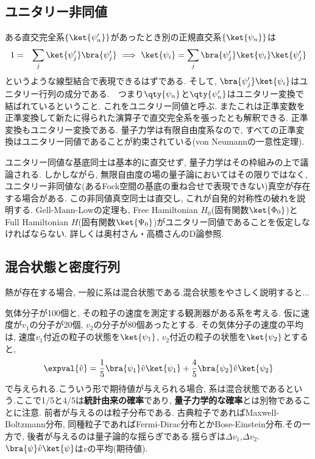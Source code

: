 \documentclass[10.5pt,a4paper]{jreport}
\begin{document}
\subsection{ユニタリー非同値}
ある直交完全系$\{\ket{\psi'_n}\}$があったとき別の正規直交系$\{\ket{\psi_n}\}$は
\begin{eqnarray}
  1 &=& \sum_j\ket{\psi'_j}\bra{\psi'_j}\ \Longrightarrow\ \ket{\psi_i} = \sum_j \bra{\psi'_j}\ket{\psi_i}\ket{\psi'_j}
\end{eqnarray}
というような線型結合で表現できるはずである. そして, $\bra{\psi'_j}\ket{\psi_i}$はユニタリー行列の成分である.　つまり$\qty{\psi_n}$と$\qty{\psi'_n}$はユニタリー変換で結ばれているということ. これをユニタリー同値と呼ぶ. またこれは正準変数を正準変換して新たに得られた演算子で直交完全系を張ったとも解釈できる. 正準変換もユニタリー変換である. 量子力学は有限自由度系なので, すべての正準変換はユニタリー同値であることが約束されている(von Neumannの一意性定理).

ユニタリー同値な基底同士は基本的に直交せず, 量子力学はその枠組みの上で議論される. しかしながら, 無限自由度の場の量子論においてはその限りではなく, ユニタリー非同値な(あるFock空間の基底の重ね合せで表現できない)真空が存在する場合がある. この非同値真空同士は直交し, これが自発的対称性の破れを説明する. Gell-Mann-Lowの定理も, Free Hamiltonian $H_0$(固有関数$\ket{\Phi_0}$)とFull Hamiltonian $H$(固有関数$\ket{\Psi_0}$)がユニタリー同値であることを仮定しなければならない. 詳しくは奥村さん・高橋さんのD論参照. 
\subsection{混合状態と密度行列}
熱が存在する場合, 一般に系は混合状態である.混合状態をやさしく説明すると...
\begin{screen}
  気体分子が100個と, その粒子の速度を測定する観測器がある系を考える. 仮に速度が$v_1$の分子が20個, $v_2$の分子が80個あったとする. その気体分子の速度の平均は, 速度$v_1$付近の粒子の状態を$\ket{\psi_1}$, $v_2$付近の粒子の状態を$\ket{\psi_2}$とすると,
  \begin{eqnarray*}
    \expval{\hat{v}} = \frac{1}{5}\bra{\psi_1}\hat{v}\ket{\psi_1} + \frac{4}{5}\bra{\psi_2}\hat{v}\ket{\psi_2}
  \end{eqnarray*}
  で与えられる.こういう形で期待値が与えられる場合, 系は混合状態であるという.ここで1/5と4/5は{\bf 統計由来の確率}であり, {\bf 量子力学的な確率}とは別物であることに注意. 前者が与えるのは粒子分布である. 古典粒子であればMaxwell-Boltzmann分布, 同種粒子であればFermi-Dirac分布とかBose-Einstein分布.その一方で, 後者が与えるのは量子論的な揺らぎである.揺らぎは$\Delta v_1$,$\Delta v_2$. $\bra{\psi}\hat{v}\ket{\psi}$は$v$の平均(期待値).
\end{screen}
\end{document}
